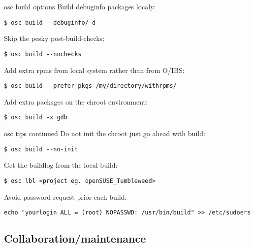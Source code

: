 \documentclass{beamer}
\begin{document}
\begin{frame}[fragile]{osc build options}
Build debuginfo packages localy:
\begin{small}
\begin{verbatim}$ osc build --debuginfo/-d\end{verbatim}
\end{small}
Skip the pesky post-build-checks:
\begin{small}
\begin{verbatim}$ osc build --nochecks\end{verbatim}
\end{small}
Add extra rpms from local system rather than from O/IBS:
\begin{small}
\begin{verbatim}$ osc build --prefer-pkgs /my/directory/withrpms/\end{verbatim}
\end{small}
Add extra packages on the chroot environment:
\begin{small}
\begin{verbatim}$ osc build -x gdb\end{verbatim}
\end{small}
\end{frame}

\begin{frame}[fragile]{osc tips continued}
Do not init the chroot just go ahead with build:
\begin{small}
\begin{verbatim}$ osc build --no-init\end{verbatim}
\end{small}
Get the buildlog from the local build:
\begin{small}
\begin{verbatim}$ osc lbl <project eg. openSUSE_Tumbleweed>\end{verbatim}
\end{small}
Avoid password request prior each build:
\begin{tiny}
\begin{verbatim}echo "yourlogin ALL = (root) NOPASSWD: /usr/bin/build" >> /etc/sudoers\end{verbatim}
\end{tiny}
\end{frame}

\subsection{Collaboration/maintenance}
\end{document}
